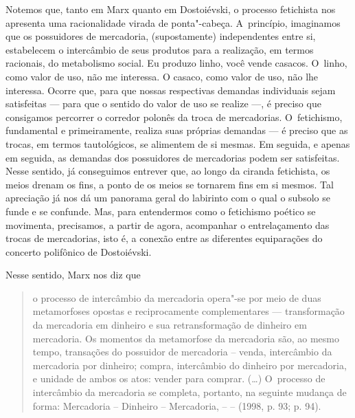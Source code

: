 Notemos que, tanto em Marx quanto em Dostoiévski, o processo fetichista
nos apresenta uma racionalidade virada de ponta"-cabeça. A~princípio,
imaginamos que os possuidores de mercadoria, (supostamente)
independentes entre si, estabelecem o intercâmbio de seus produtos para
a realização, em termos racionais, do metabolismo social. Eu produzo
linho, você vende casacos. O~linho, como valor de uso, não me interessa.
O casaco, como valor de uso, não lhe interessa. Ocorre que, para que
nossas respectivas demandas individuais sejam satisfeitas --- para que o
sentido do valor de uso se realize ---, é preciso que consigamos
percorrer o corredor polonês da troca de mercadorias. O~fetichismo,
fundamental e primeiramente, realiza suas próprias demandas --- é preciso
que as trocas, em termos tautológicos, se alimentem de si mesmas. Em
seguida, e apenas em seguida, as demandas dos possuidores de mercadorias
podem ser satisfeitas. Nesse sentido, já conseguimos entrever que, ao
longo da ciranda fetichista, os meios drenam os fins, a ponto de os
meios se tornarem fins em si mesmos. Tal apreciação já nos dá um
panorama geral do labirinto com o qual o subsolo se funde e se confunde.
Mas, para entendermos como o fetichismo poético se movimenta,
precisamos, a partir de agora, acompanhar o entrelaçamento das trocas de
mercadorias, isto é, a conexão entre as diferentes equiparações do
concerto polifônico de Dostoiévski.

Nesse sentido, Marx nos diz que

\begin{quote}
o processo de intercâmbio da mercadoria opera"-se por meio de duas
metamorfoses opostas e reciprocamente complementares --- transformação da
mercadoria em dinheiro e sua retransformação de dinheiro em mercadoria.
Os momentos da metamorfose da mercadoria são, ao mesmo tempo, transações
do possuidor de mercadoria -- venda, intercâmbio da mercadoria por
dinheiro; compra, intercâmbio do dinheiro por mercadoria, e unidade de
ambos os atos: vender para comprar. (\ldots) O~processo de intercâmbio da
mercadoria se completa, portanto, na seguinte mudança de forma:
Mercadoria -- Dinheiro -- Mercadoria,  --  --  (1998, p. 93; p. 94).
\end{quote}

